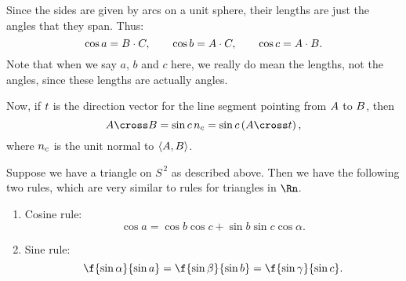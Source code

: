 
Since the sides are given by arcs on a unit sphere, their lengths are just the angles that they span. Thus:
\begin{equation*}
	\cos a = \BB\cdot\CC, \qquad \cos b = \AA\cdot\CC, \qquad \cos c = \AA\cdot\BB.
\end{equation*}
Note that when we say $a$, $b$ and $c$ here, we really do mean the lengths, not the angles, since these lengths are actually angles.


Now, if $\tt$ is the direction vector for the line segment pointing from $\AA$ to $\BB$, then
\begin{equation*}
	\AA\cross\BB = \sin c\,\nn_c = \sin c\left( \AA\cross\tt \right),
\end{equation*}
where $\nn_c$ is the unit normal to $\left\langle \AA,\BB \right\rangle$.


	\pagebreak

\begin{proposition}
	Suppose we have a triangle on $S^{\,2}$ as described above. Then we have the following two rules, which are very similar to rules for triangles in $\Rn$. %
	\begin{enumerate}
		\item Cosine rule:
		\begin{equation*}
			\cos a = \cos b \cos c + \sin b \sin c \cos \alpha.
		\end{equation*}
		\item Sine rule:
		\begin{equation*}
			\f{\sin \alpha}{\sin a} = \f{\sin\beta}{\sin b} = \f{\sin\gamma}{\sin c}.
		\end{equation*}
	\end{enumerate}
\end{proposition}

